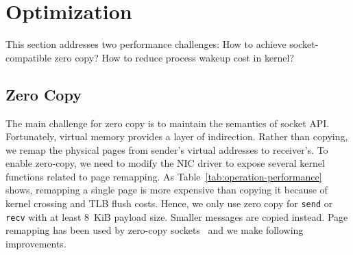 \section{Optimization}
\label{sec:optimization}

This section addresses two performance challenges: How to achieve socket-compatible zero copy? How to reduce process wakeup cost in kernel?



\subsection{Zero Copy}
\label{subsec:zerocopy}



The main challenge for zero copy is to maintain the semantics of socket API.
Fortunately, virtual memory provides a layer of indirection. %
Rather than copying, we remap the physical pages from sender's virtual addresses to receiver's.
To enable zero-copy, we need to modify the NIC driver to expose several kernel functions related to page remapping. 
As Table~\ref{tab:operation-performance} shows, remapping a single page is more expensive than copying it because of kernel crossing and TLB flush costs. Hence, we only use zero copy for \texttt{send} or \texttt{recv} with at least 8~KiB payload size.
Smaller messages are copied instead.
Page remapping has been used by zero-copy sockets~\cite{thadani1995efficient,chu1996zero,linux-zero-copy} and we make following improvements.

